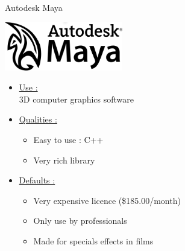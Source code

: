 \documentclass[a4paper,10pt]{beamer}
\begin{document}
			\begin{frame}{Autodesk Maya}
				\begin{multicols}{2}
					\includegraphics[height=60pt]{images/logos/Autodesk_Maya.png}\\
					
					\columnbreak 
					
					\begin{itemize}
						\item \underline{Use :}\\		
						3D computer graphics software		
						\item \underline{Qualities :}\\
						\begin{itemize}
							\item Easy to use : C++
							\item Very rich library
						\end{itemize}
					\end{itemize}		 
				\end{multicols}
				\begin{itemize}
					\item \underline{Defaults :}\\
					\begin{itemize}
						\item Very expensive licence (\$185.00/month)
						\item Only use by professionals
						\item Made for specials effects in films
					\end{itemize}
				\end{itemize}
			\end{frame}
		
\end{document}
